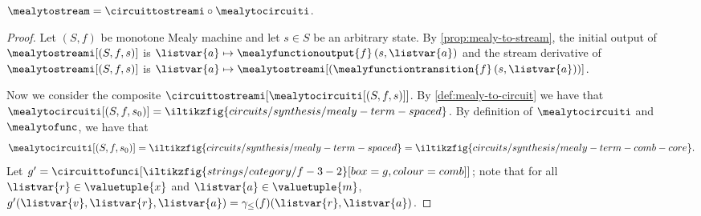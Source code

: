 \begin{theorem}\label{thm:mealy-to-circuit}
    \(
    \mealytostream = \circuittostreami \circ \mealytocircuiti
    \).
\end{theorem}
\begin{proof}
    Let \((S ,f)\) be monotone Mealy machine and let \(s \in S\) be an arbitrary
    state.
    By \cref{prop:mealy-to-stream}, the initial output of
    \(\mealytostreami[(S, f, s)]\) is
    \(\listvar{a} \mapsto \mealyfunctionoutput{f}\left(s, \listvar{a}\right)\)
    and the stream derivative of \(\mealytostreami[(S, f, s)]\) is \(
    \listvar{a}
    \mapsto
    \mealytostreami[(\mealyfunctiontransition{f}\left(s, \listvar{a}\right))]
    \).

    Now we consider the composite
    \(\circuittostreami[\mealytocircuiti[(S, f, s)]]\).
    By \cref{def:mealy-to-circuit} we have that \(
    \mealytocircuiti[(S, f, s_0)]
    =
    \iltikzfig{circuits/synthesis/mealy-term-spaced}
    \).
    By definition of \(\mealytocircuiti\) and \(\mealytofunc\),
    we have that\[
        \mealytocircuiti[(S, f, s_0)]
        =
        \iltikzfig{circuits/synthesis/mealy-term-spaced}
        =
        \iltikzfig{circuits/synthesis/mealy-term-comb-core}.
    \]
    Let \(
    g^\prime
    =
    \circuittofunci[\iltikzfig{strings/category/f-3-2}[box=g,colour=comb]]
    \); note that for all \(\listvar{r} \in \valuetuple{x}\) and
    \(\listvar{a} \in \valuetuple{m}\),
    \(g^\prime(\listvar{v}, \listvar{r}, \listvar{a})
    =
    \gamma_\leq(f)(\listvar{r},\listvar{a})
    \).


\end{proof}
